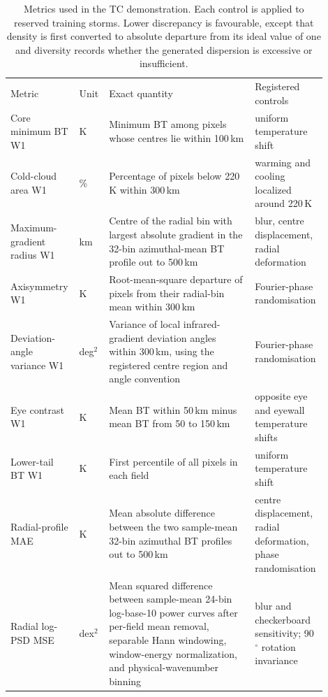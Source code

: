 \documentclass[gmd, manuscript]{copernicus}
\begin{document}
\begin{table}[t]
\caption{Metrics used in the TC demonstration. Each control is applied to reserved
training storms. Lower discrepancy is favourable, except that density is first
converted to absolute departure from its ideal value of one and diversity records
whether the generated dispersion is excessive or insufficient.}
\label{tab:smetrics}
\centering
\begin{tabular}{>{\raggedright\arraybackslash}p{0.18\linewidth}
                  >{\raggedright\arraybackslash}p{0.09\linewidth}
                  >{\raggedright\arraybackslash}p{0.45\linewidth}
                  >{\raggedright\arraybackslash}p{0.18\linewidth}}
\tophline
Metric & Unit & Exact quantity & Registered controls\\
\middlehline
Core minimum BT W1 & K & Minimum BT among pixels whose centres lie within 100\,km & uniform temperature shift\\
Cold-cloud area W1 & \% & Percentage of pixels below 220\,K within 300\,km & warming and cooling localized around 220\,K\\
Maximum-gradient radius W1 & km & Centre of the radial bin with largest absolute gradient in the 32-bin azimuthal-mean BT profile out to 500\,km & blur, centre displacement, radial deformation\\
Axisymmetry W1 & K & Root-mean-square departure of pixels from their radial-bin mean within 300\,km & Fourier-phase randomisation\\
Deviation-angle variance W1 & deg\(^2\) & Variance of local infrared-gradient deviation angles within 300\,km, using the registered centre region and angle convention & Fourier-phase randomisation\\
Eye contrast W1 & K & Mean BT within 50\,km minus mean BT from 50 to 150\,km & opposite eye and eyewall temperature shifts\\
Lower-tail BT W1 & K & First percentile of all pixels in each field & uniform temperature shift\\
Radial-profile MAE & K & Mean absolute difference between the two sample-mean 32-bin azimuthal BT profiles out to 500\,km & centre displacement, radial deformation, phase randomisation\\
Radial log-PSD MSE & dex\(^2\) & Mean squared difference between sample-mean 24-bin log-base-10 power curves after per-field mean removal, separable Hann windowing, window-energy normalization, and physical-wavenumber binning & blur and checkerboard sensitivity; 90\(^\circ\) rotation invariance\\

\end{tabular}
\end{table}
\end{document}
